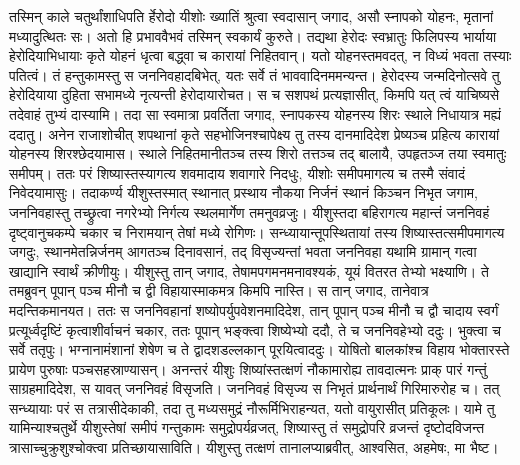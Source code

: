 \adhyAya
{}
\vakya तस्मिन् काले चतुर्थांशाधिपति र्हेरोदो यीशोः ख्यातिं श्रुत्वा स्वदासान् जगाद,
\vakya असौ स्नापको योहनः, मृतानां मध्यादुत्थितः सः। अतो हि प्रभाववैभवं तस्मिन् स्वकार्यं कुरुते।
\vakya तद्यथा हेरोदः स्वभ्रातुः फिलिपस्य भार्याया हेरोदियाभिधायाः कृते योहनं धृत्वा बद्ध्वा च कारायां निहितवान्।
\vakya यतो योहनस्तमवदत्, न विध्यं भवता तस्याः पतित्वं।
\vakya तं हन्तुकामस्तु स जननिवहादबिभेत्, यतः सर्वे तं भाववादिनममन्यन्त।
\vakya हेरोदस्य जन्मदिनोत्सवे तु हेरोदियाया दुहिता सभामध्ये नृत्यन्ती हेरोदायारोचत।
\vakya स च सशपथं प्रत्यज्ञासीत्, किमपि यत् त्वं याचिष्यसे तदेवाहं तुभ्यं दास्यामि।
\vakya तदा सा स्वमात्रा प्रवर्तिता जगाद, स्नापकस्य योहनस्य शिरः स्थाले निधायात्र मह्यं ददातु।
\vakya अनेन राजाशोचीत् शपथानां कृते सहभोजिनश्चापेक्ष्य
\vakya तु तस्य दानमादिदेश प्रेष्यञ्च प्रहित्य कारायां योहनस्य शिरश्छेदयामास।
\vakya स्थाले निहितमानीतञ्च तस्य शिरो तत्तञ्च तद् बालायै, उपहृतञ्ज तया स्वमातुः समीपम्।
\vakya ततः परं शिष्यास्तस्यागत्य शवमादाय शवागारे निदधुः, यीशोः समीपमागत्य च तस्मै संवादं निवेदयामासुः।
\vakya तदाकर्ण्य यीशुस्तस्मात् स्थानात् प्रस्थाय नौकया निर्जनं स्थानं किञ्चन निभृत जगाम, जननिवहास्तु तच्छ्रुत्वा नगरेभ्यो निर्गत्य स्थलमार्गेण तमनुवव्रजुः।
\vakya यीशुस्तदा बहिरागत्य महान्तं जननिवहं दृष्ट्वानुचकम्पे चकार च निरामयान् तेषां मध्ये रोगिणः।
\vakya सन्ध्यायान्तूपस्थितायां तस्य शिष्यास्तत्समीपमागत्य जगदुः, स्थानमेतन्निर्जनम् आगतञ्च दिनावसानं, तद् विसृज्यन्तां भवता जननिवहा यथामि ग्रामान् गत्वा खाद्यानि स्वार्थं क्रीणीयुः।
\vakya यीशुस्तु तान् जगाद, तेषामपगमनमनावश्यकं, यूयं वितरत तेभ्यो भक्ष्याणि।
\vakya ते तमब्रुवन् पूपान् पञ्च मीनौ च द्वी विहायास्माकमत्र किमपि नास्ति।
\vakya स तान् जगाद, तानेवात्र मदन्तिकमानयत।
\vakya ततः स जननिवहानां शष्योपर्युपवेशनमादिदेश, तान् पूपान् पञ्च मीनौ च द्वौ चादाय स्वर्गं प्रत्यूर्ध्वदृष्टिं कृत्वाशीर्वाचनं चकार, ततः पूपान् भङ्क्त्वा शिष्येभ्यो ददौ, ते च जननिवहेभ्यो ददुः।
\vakya भुक्त्वा च सर्वे ततृपुः। भग्नानामंशानां शेषेण च ते द्वादशडल्लकान् पूरयित्वाददुः।
\vakya योषितो बालकांश्च विहाय भोक्तारस्ते प्रायेण पुरुषाः पञ्चसहस्राण्यासन्।
\vakya अनन्तरं यीशुः शिष्यांस्तत्क्षणं नौकामारोह्य तावदात्मनः प्राक् पारं गन्तुं साग्रहमादिदेश, स यावत् जननिवहं विसृजति।
\vakya जननिवहं विसृज्य स निभृतं प्रार्थनार्थं गिरिमारुरोह च। तत् सन्ध्यायाः परं स तत्रासीदेकाकी,
\vakya तदा तु मध्यसमुद्रं नौरूर्मिभिराहन्यत, यतो वायुरासीत् प्रतिकूलः।
\vakya यामे तु यामिन्याश्चतुर्थे यीशुस्तेषां समीपं गन्तुकामः समुद्रोपर्यव्रजत्,
\vakya शिष्यास्तु तं समुद्रोपरि व्रजन्तं दृष्टोदविजन्त त्रासाच्चुक्रुशुश्चोक्त्वा प्रतिच्छायासाविति।
\vakya यीशुस्तु तत्क्षणं तानालप्याब्रवीत्, आश्वसित, अहमेषः, मा भैष्ट।
